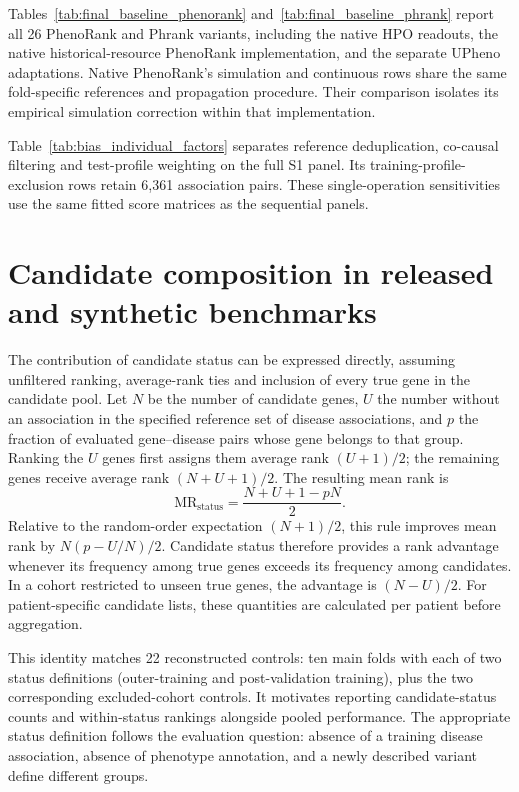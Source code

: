 \documentclass{article}
\begin{document}
Tables~\ref{tab:final_baseline_phenorank} and~\ref{tab:final_baseline_phrank}
report all 26 PhenoRank and Phrank variants, including the native HPO readouts,
the native historical-resource PhenoRank implementation, and the separate
UPheno adaptations. Native PhenoRank's simulation and continuous rows share
the same fold-specific references and propagation procedure. Their comparison
isolates its empirical simulation correction within that implementation.

Table~\ref{tab:bias_individual_factors} separates reference deduplication,
co-causal filtering and test-profile weighting on the full S1 panel. Its
training-profile-exclusion rows retain 6{,}361 association pairs. These
single-operation sensitivities use the same fitted score matrices as the
sequential panels.






\section{Candidate composition in released and synthetic benchmarks}
\label{sec:candidate_composition}

The contribution of candidate status can be expressed directly, assuming
unfiltered ranking, average-rank ties and inclusion of every true gene in
the candidate pool. Let $N$ be
the number of candidate genes, $U$ the number without an association in
the specified reference set of disease associations, and $p$ the fraction
of evaluated gene--disease pairs whose gene belongs to that group.
Ranking the $U$ genes first assigns them average rank $(U+1)/2$; the
remaining genes receive average rank $(N+U+1)/2$. The resulting mean rank is
\begin{equation}
  \mathrm{MR}_{\mathrm{status}}=\frac{N+U+1-pN}{2}.
\end{equation}
Relative to the random-order expectation $(N+1)/2$, this rule improves
mean rank by $N(p-U/N)/2$. Candidate status therefore provides a rank
advantage whenever its frequency among true genes exceeds its frequency
among candidates. In a cohort restricted to unseen true genes, the
advantage is $(N-U)/2$. For patient-specific candidate lists, these
quantities are calculated per patient before aggregation.

This identity matches 22 reconstructed controls: ten main folds with each
of two status definitions (outer-training and post-validation training), plus
the two corresponding excluded-cohort controls. It motivates reporting candidate-status counts and
within-status rankings alongside pooled performance. The appropriate
status definition follows the evaluation question: absence of a training
disease association, absence of phenotype annotation, and a newly
described variant define different groups.
\end{document}
